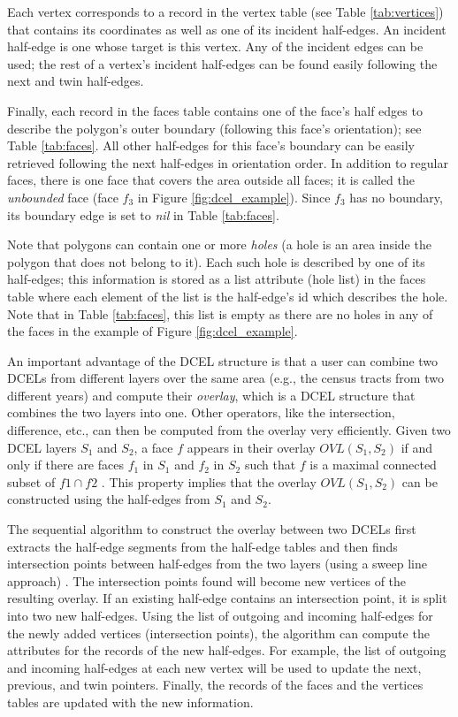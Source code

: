 Each vertex corresponds to a record in the vertex table (see Table \ref{tab:vertices}) that contains its coordinates as well as one of its incident half-edges.  An incident half-edge is one whose target is this vertex. Any of the incident edges can be used; the rest of a vertex's incident half-edges can be found easily following the next and twin half-edges.

Finally, each record in the faces table contains one of the face's half edges to describe the polygon's outer boundary (following this face's orientation); see Table \ref{tab:faces}. All other half-edges for this face's boundary can be easily retrieved following the next half-edges in orientation order. In addition to regular faces, there is one face that covers the area outside all faces; it is called the  \textit{unbounded} face (face $f_3$ in Figure \ref{fig:dcel_example}). Since $f_3$ has no boundary, its boundary edge is set to \textit{nil} in Table \ref{tab:faces}.

Note that polygons can contain one or more \textit{holes} (a hole is an area inside the polygon that does not belong to it). Each such hole is described by one of its half-edges; this information is stored as a list attribute (hole list) in the faces table where each element of the list is the half-edge's id which describes the hole. Note that in Table \ref{tab:faces}, this list is empty as there are no holes in any of the faces in the example of Figure \ref{fig:dcel_example}. 

An important advantage of the DCEL structure is that a user can combine two DCELs from different layers over the same area (e.g., the census tracts from two different years) and compute their \textit{overlay}, which is a DCEL structure that combines the two layers into one. Other operators, like the intersection, difference, etc., can then be computed from the overlay very efficiently. Given two DCEL layers $S_1$ and $S_2$, a face $f$ appears in their overlay  $OVL(S_1, S_2)$ if and only if there are faces $f_1$ in $S_1$ and $f_2$ in $S_2$ such that $f$ is a maximal connected subset of $f1 \cap f2$ \cite{berg_computational_2008}. This property implies that the overlay $OVL(S_1, S_2)$ can be constructed using the half-edges from $S_1$ and $S_2$. 

The sequential algorithm \cite{fogel_cgal_2012} to construct the overlay between two DCELs first extracts the half-edge segments from the half-edge tables and then finds intersection points between half-edges from the two layers (using a sweep line approach) \cite{berg_computational_2008}. The intersection points found will become new vertices of the resulting overlay. If an existing half-edge contains an intersection point, it is split into two new half-edges. Using the list of outgoing and incoming half-edges for the newly added vertices (intersection points), the algorithm can compute the attributes for the records of the new half-edges. For example, the list of outgoing and incoming half-edges at each new vertex will be used to update the next, previous, and twin pointers. Finally, the records of the faces and the vertices tables are updated with the new information. 

